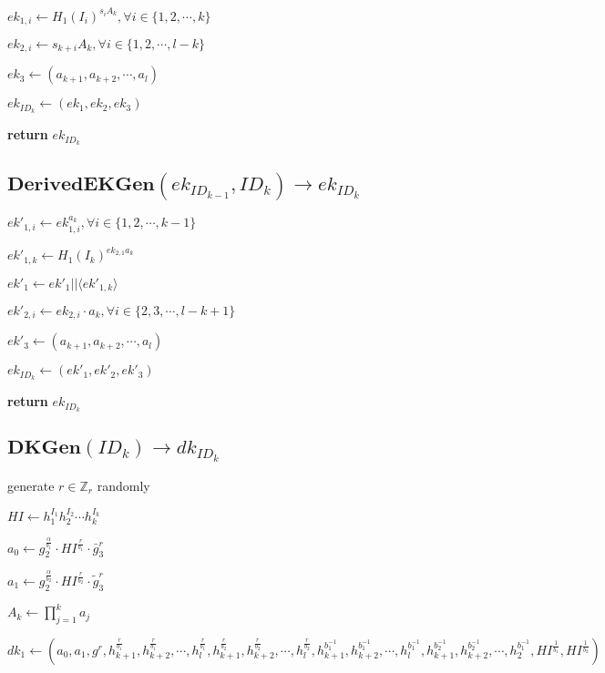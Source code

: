 \documentclass[a4paper]{article}
\begin{document}
$\textit{ek}_{1, i} \gets H_1(I_i)^{s_i A_k}, \forall i \in \{1, 2, \cdots, k\}$

$\textit{ek}_{2, i} \gets s_{k + i}A_k, \forall i \in \{1, 2, \cdots, l - k\}$

$\textit{ek}_3 \gets (a_{k + 1}, a_{k + 2}, \cdots, a_l)$

$\textit{ek}_{\textit{ID}_k} \gets (\textit{ek}_1, \textit{ek}_2, \textit{ek}_3)$

\textbf{return} $\textit{ek}_{\textit{ID}_k}$

\subsection{$\textbf{DerivedEKGen}(\textit{ek}_{\textit{ID}_{k - 1}}, \textit{ID}_k) \rightarrow \textit{ek}_{\textit{ID}_k}$}

$\textit{ek}'_{1, i} \gets \textit{ek}_{1, i}^{a_k}, \forall i \in \{1, 2, \cdots, k - 1\}$

$\textit{ek}'_{1, k} \gets H_1(I_k)^{\textit{ek}_{2, 1} a_k}$

$\textit{ek}'_1 \gets \textit{ek}'_1 || \langle\textit{ek}'_{1, k}\rangle$

$\textit{ek}'_{2, i} \gets \textit{ek}_{2, i} \cdot a_k, \forall i \in \{2, 3, \cdots, l - k + 1\}$

$\textit{ek}'_3 \gets (a_{k + 1}, a_{k + 2}, \cdots, a_l)$

$\textit{ek}_{\textit{ID}_k} \gets (\textit{ek}'_1, \textit{ek}'_2, \textit{ek}'_3)$

\textbf{return} $\textit{ek}_{\textit{ID}_k}$

\subsection{$\textbf{DKGen}(\textit{ID}_k) \rightarrow \textit{dk}_{\textit{ID}_k}$}

generate $r \in \mathbb{Z}_r$ randomly

$\textit{HI} \gets h_1^{I_1} h_2^{I_2} \cdots h_k^{I_k}$

$a_0 \gets g_2^{\frac{\alpha}{b_1}} \cdot \textit{HI}^{\frac{r}{b_1}} \cdot \bar{g}_3^r$

$a_1 \gets g_2^{\frac{\alpha}{b_2}} \cdot \textit{HI}^{\frac{r}{b_2}} \cdot \tilde{g}_3^r$

$A_k \gets \prod\limits_{j = 1}^k a_j$

$\textit{dk}_1 \gets (
a_0, a_1, g^r,\allowbreak 
h_{k + 1}^{\frac{r}{b_1}}, h_{k + 2}^{\frac{r}{b_1}}, \cdots, h_l^{\frac{r}{b_1}},\allowbreak 
h_{k + 1}^{\frac{r}{b_2}}, h_{k + 2}^{\frac{r}{b_2}}, \cdots, h_l^{\frac{r}{b_2}},\allowbreak 
h_{k + 1}^{b_1^{-1}}, h_{k + 2}^{b_1^{-1}}, \cdots, h_l^{b_1^{-1}},\allowbreak 
h_{k + 1}^{b_2^{-1}}, h_{k + 2}^{b_2^{-1}}, \cdots, h_2^{b_1^{-1}},\allowbreak 
\textit{HI}^{\frac{1}{b_1}}, \textit{HI}^{\frac{1}{b_2}}
)$
\end{document}
